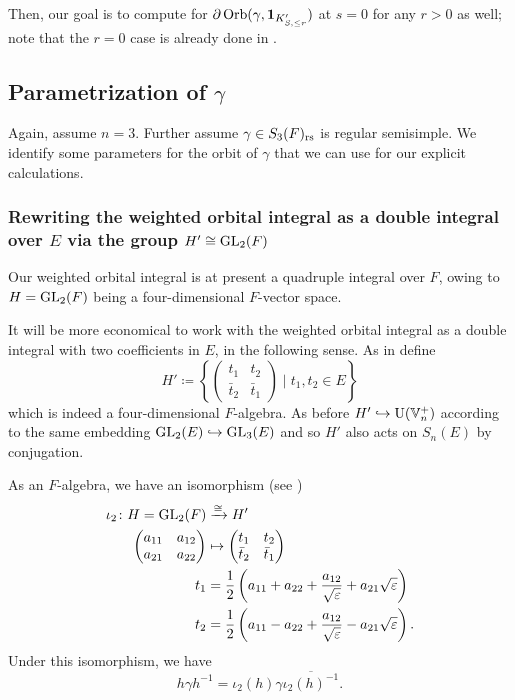 Then, our goal is to compute for
$\partial \operatorname{Orb}(\gamma, \mathbf{1}_{K'_{S, \le r}})$
at $s=0$ for any $r > 0$ as well;
note that the $r = 0$ case is already done in \cite{ref:AFL}.

\subsection{Parametrization of $\gamma$}
Again, assume $n = 3$.
Further assume $\gamma \in S_3(F)_{\mathrm{rs}}$ is regular semisimple.
We identify some parameters for the orbit of $\gamma$
that we can use for our explicit calculations.

\subsubsection{Rewriting the weighted orbital integral as a double integral over $E$
  via the group $H' \cong \operatorname{GL}_2(F)$}
Our weighted orbital integral is at present a quadruple integral over $F$,
owing to $H = \operatorname{GL}_{2}(F)$ being a four-dimensional $F$-vector space.

It will be more economical to work with the weighted orbital integral
as a double integral with two coefficients in $E$, in the following sense.
As in \cite[\S4.1]{ref:AFL} define
\[ H' \coloneqq
  \left\{ \begin{pmatrix} t_1 & t_2 \\ \bar t_2 & \bar t_1 \end{pmatrix}
    \mid t_1, t_2 \in E \right\}
\]
which is indeed a four-dimensional $F$-algebra.
As before $H' \hookrightarrow \operatorname{U}(\mathbb V_n^+)$ according to the same embedding
$\operatorname{GL}_2(E) \hookrightarrow \operatorname{GL}_3(E)$
and so $H'$ also acts on $S_n(E)$ by conjugation.

As an $F$-algebra, we have an isomorphism (see \cite[\S4.1]{ref:AFL})
\begin{align*}
  \iota_2 \colon H = \operatorname{GL}_2(F)
  &\xrightarrow{\cong} H' \\
  \begin{pmatrix} a_{11} & a_{12} \\ a_{21} & a_{22} \end{pmatrix}
  &\mapsto \begin{pmatrix} t_1 & t_2 \\ \bar t_2 & \bar t_1 \end{pmatrix} \\
  t_1 &= \frac{1}{2}\left( a_{11} + a_{22} + \frac{a_{12}}{\sqrt{\varepsilon}} + a_{21} \sqrt{\varepsilon} \right) \\
  t_2 &= \frac{1}{2}\left( a_{11} - a_{22} + \frac{a_{12}}{\sqrt{\varepsilon}} - a_{21} \sqrt{\varepsilon} \right).
\end{align*}
Under this isomorphism, we have
\[ h \gamma h^{-1} = \iota_2(h) \gamma \overline{\iota_2(h)^{-1}}. \]

